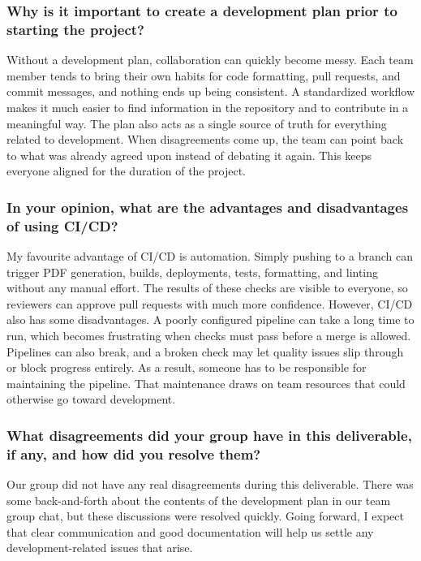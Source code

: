\documentclass{article}
\begin{document}
\subsubsection*{Why is it important to create a development plan prior to starting the project?}
Without a development plan, collaboration can quickly become messy. Each team member tends to
bring their own habits for code formatting, pull requests, and commit messages, and nothing ends
up being consistent. A standardized workflow makes it much easier to find information in the
repository and to contribute in a meaningful way. The plan also acts as a single source of truth
for everything related to development. When disagreements come up, the team can point back to
what was already agreed upon instead of debating it again. This keeps everyone aligned for the
duration of the project.

\subsubsection*{In your opinion, what are the advantages and disadvantages of using CI/CD?}
My favourite advantage of CI/CD is automation. Simply pushing to a branch can trigger PDF
generation, builds, deployments, tests, formatting, and linting without any manual effort. The
results of these checks are visible to everyone, so reviewers can approve pull requests with much
more confidence. However, CI/CD also has some disadvantages. A poorly
configured pipeline can take a long time to run, which becomes frustrating when checks must pass
before a merge is allowed. Pipelines can also break, and a broken check may let quality issues slip
through or block progress entirely. As a result, someone has to be responsible for maintaining the
pipeline. That maintenance draws on team resources that could otherwise go toward development.

\subsubsection*{What disagreements did your group have in this deliverable, if any, and how did you resolve them?}
Our group did not have any real disagreements during this deliverable. There was some back-and-forth
about the contents of the development plan in our team group chat, but these discussions
were resolved quickly. Going forward, I expect that clear communication and good documentation
will help us settle any development-related issues that arise.

\newpage{}
\end{document}
